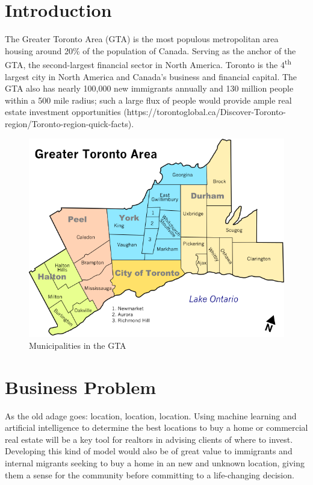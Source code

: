 \documentclass{article}
\begin{document}



\tableofcontents

\newpage

\section{Introduction}

The Greater Toronto Area (GTA) is the most populous metropolitan area housing around 20\% of the population of Canada. Serving as the anchor of the GTA, the second-largest financial sector in North America. Toronto is the 4\textsuperscript{th} largest city in North America and Canada's business and financial capital. The GTA also has nearly 100,000 new immigrants annually and 130 million people within a 500 mile radius; such a large flux of people would provide ample real estate investment opportunities (https://torontoglobal.ca/Discover-Toronto-region/Toronto-region-quick-facts).   

\begin{figure}[h]
	\centering
	\includegraphics[width=\textwidth]{gta_map.png}
	\caption{Municipalities in the GTA}
	\label{gta}
\end{figure}


\section{Business Problem}

As the old adage goes: location, location, location. Using machine learning and artificial intelligence to determine the best locations to buy a home or commercial real estate will be a key tool for realtors in advising clients of where to invest. Developing this kind of model would also be of great value to immigrants and internal migrants seeking to buy a home in an new and unknown location, giving them a sense for the community before committing to a life-changing decision.
\end{document}
